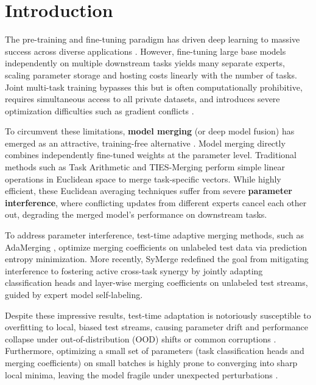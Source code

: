 \documentclass{article}
\begin{document}
\section{Introduction}
\label{sec:intro}
The pre-training and fine-tuning paradigm has driven deep learning to massive success across diverse applications \cite{devlin19bert, vaswani17attention, he16resnet, dosovitskiy21vit}. However, fine-tuning large base models independently on multiple downstream tasks yields many separate experts, scaling parameter storage and hosting costs linearly with the number of tasks. Joint multi-task training bypasses this but is often computationally prohibitive, requires simultaneous access to all private datasets, and introduces severe optimization difficulties such as gradient conflicts \cite{yadav23ties, shutao24ties}.

To circumvent these limitations, \textbf{model merging} (or deep model fusion) has emerged as an attractive, training-free alternative \cite{wortsman22soups, ilharco22arithmetic}. Model merging directly combines independently fine-tuned weights at the parameter level. Traditional methods such as Task Arithmetic \cite{ilharco22arithmetic} and TIES-Merging \cite{yadav23ties} perform simple linear operations in Euclidean space to merge task-specific vectors. While highly efficient, these Euclidean averaging techniques suffer from severe \textbf{parameter interference}, where conflicting updates from different experts cancel each other out, degrading the merged model's performance on downstream tasks.

To address parameter interference, test-time adaptive merging methods, such as AdaMerging \cite{yang24adamerging}, optimize merging coefficients on unlabeled test data via prediction entropy minimization. More recently, SyMerge \cite{jung26symerge} redefined the goal from mitigating interference to fostering active cross-task synergy by jointly adapting classification heads and layer-wise merging coefficients on unlabeled test streams, guided by expert model self-labeling.

Despite these impressive results, test-time adaptation is notoriously susceptible to overfitting to local, biased test streams, causing parameter drift and performance collapse under out-of-distribution (OOD) shifts or common corruptions \cite{li23survey, hendrycks19robustness}. Furthermore, optimizing a small set of parameters (task classification heads and merging coefficients) on small batches is highly prone to converging into sharp local minima, leaving the model fragile under unexpected perturbations \cite{foret21sam}.
\end{document}
